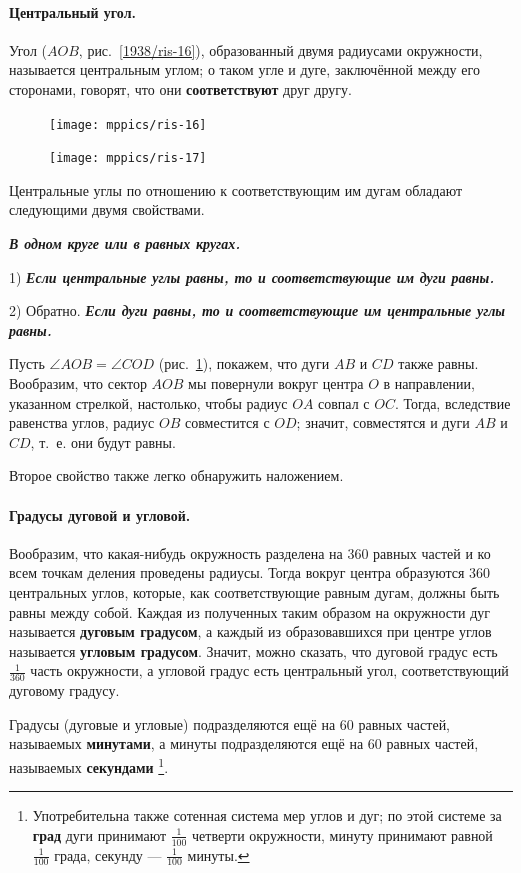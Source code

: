 \documentclass[oneside]{book}
\begin{document}
\paragraph{Центральный угол.}\label{1938/17}
Угол ($AOB$, рис.~\ref{1938/ris-16}), образованный двумя радиусами окружности, называется центральным углом;
о таком угле и дуге, заключённой между его сторонами, говорят, что они \textbf{соответствуют} друг другу.

\begin{figure}
\centering
\texttt{[image: mppics/ris-16]}
\caption{}\label{1938/ris-16}
\bigskip
\texttt{[image: mppics/ris-17]}
\caption{}\label{1938/ris-17}
\end{figure}

Центральные углы по отношению к соответствующим им дугам обладают следующими двумя свойствами.

\textbf{\emph{В одном круге или в равных кругах.}}

1) \textbf{\emph{Если центральные углы равны, то и соответствующие им дуги равны.}}

2) Обратно.
\textbf{\emph{Если дуги равны, то и соответствующие им центральные углы равны.}}


Пусть $\angle AOB=\angle COD$ (рис.~\ref{1938/ris-17}), покажем, что дуги $AB$ и $CD$ также равны.
Вообразим, что сектор $AOB$ мы повернули вокруг центра $O$ в направлении, указанном стрелкой, настолько, чтобы радиус $OA$ совпал с $OC$.
Тогда, вследствие равенства углов, радиус $OB$ совместится с $OD$;
значит, совместятся и дуги $AB$ и $CD$, т.~е.
они будут равны.

Второе свойство также легко обнаружить наложением.

\paragraph{Градусы дуговой и угловой.}\label{1938/18}
Вообразим, что какая-нибудь окружность разделена на 360 равных частей и ко всем точкам деления проведены радиусы.
Тогда вокруг центра образуются 360 центральных углов, которые, как соответствующие равным дугам, должны быть равны между собой.
Каждая из полученных таким образом на окружности дуг называется \textbf{дуговым градусом}, а каждый из образовавшихся при центре углов называется \textbf{угловым градусом}.
Значит, можно сказать, что дуговой градус есть $\tfrac1{360}$ часть окружности, а угловой градус есть центральный угол, соответствующий дуговому градусу.

Градусы (дуговые и угловые) подразделяются ещё на 60 равных частей, называемых \textbf{минутами}, а минуты подразделяются ещё на 60 равных частей, называемых \textbf{секундами}%
\footnote{Употребительна также сотенная система мер углов и дуг;
по этой системе за \textbf{град} дуги принимают $\tfrac1{100}$ четверти окружности, минуту принимают равной $\tfrac1{100}$ града, секунду — $\tfrac1{100}$ минуты.}.
\end{document}
